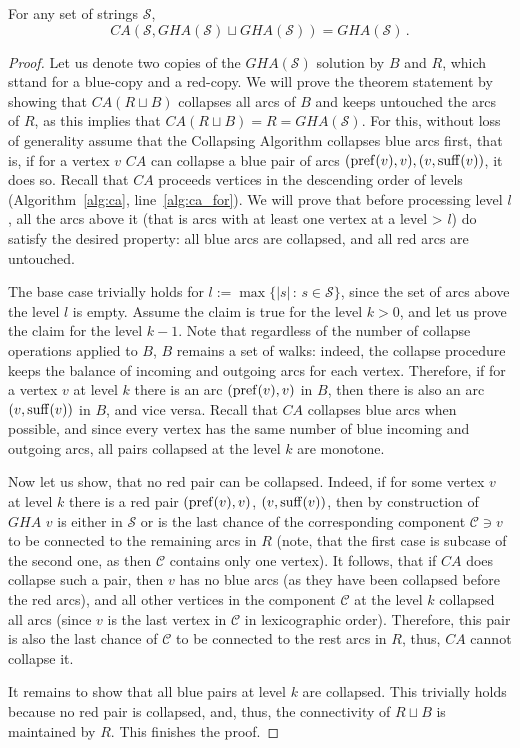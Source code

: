  \begin{theorem}
For any set of strings $\mathcal{S}$,
\[
			CA(\mathcal{S}, GHA(\mathcal{S}) \sqcup GHA(\mathcal{S})) = GHA(\mathcal{S}) \, .
\]
\end{theorem}
\begin{proof}
Let us denote two copies of the $GHA(\mathcal{S})$ solution by $B$ and $R$, which sttand for a blue-copy and a red-copy. We will prove the theorem statement by showing that $CA(R \sqcup B)$ collapses all arcs of $B$ and keeps untouched the arcs of $R$, as this implies that $CA(R \sqcup B)=R=GHA(\mathcal{S})$. For this, without loss of generality assume that the Collapsing Algorithm collapses blue arcs first, that is, if for a vertex $v$ $CA$ can collapse a blue pair of arcs $(\operatorname{pref}(v), v), (v, \operatorname{suff}(v))$, it does so. Recall that $CA$ proceeds vertices in the descending order of levels (Algorithm~\ref{alg:ca}, line~\ref{alg:ca_for}). We will prove that before processing level $l$, all the arcs above it (that is arcs with at least one vertex at a level > $l$) do satisfy the desired property: all blue arcs are collapsed, and all red arcs are untouched.

The base case trivially holds for $l := \max\{|s| \, : \, s\in\mathcal{S}\}$, since the set of arcs above the level $l$ is empty. Assume the claim is true for the level $k > 0$, and let us prove the claim for the level $k - 1$. Note that regardless of the number of collapse operations applied to $B$, $B$ remains a set of walks: indeed, the collapse procedure keeps the balance of incoming and outgoing arcs for each vertex. Therefore, if for a vertex $v$ at level $k$ there is an arc $(\operatorname{pref}(v), v)$ in $B$, then there is also an arc $(v, \operatorname{suff}(v))$ in $B$, and vice versa. Recall that $CA$ collapses blue arcs when possible, and since every vertex has the same number of blue incoming and outgoing arcs, all pairs collapsed at the level $k$ are monotone. 
	
	Now let us show, that no red pair can be collapsed. Indeed, if for some vertex $v$ at level $k$ there is a red pair $(\operatorname{pref}(v), v)$, $(v, \operatorname{suff}(v))$, then by construction of $GHA$ $v$ is either in $\mathcal{S}$ or is the last chance of the corresponding component $\mathcal{C} \ni v$ to be connected to the remaining arcs in $R$ (note, that the first case is subcase of the second one, as then $\mathcal{C}$ contains only one vertex). It follows, that if $CA$ does collapse such a pair, then $v$ has no blue arcs (as they have been collapsed before the red arcs), and all other vertices in the component $\mathcal{C}$ at the level $k$ collapsed all arcs (since $v$ is the last vertex in $\mathcal{C}$ in lexicographic order). Therefore, this pair is also the last chance of $\mathcal{C}$ to be connected to the rest arcs in $R$, thus, $CA$ cannot collapse it.
	
	It remains to show that all blue pairs at level $k$ are collapsed. This trivially holds because no red pair is collapsed, and, thus, the connectivity of $R \sqcup B$ is maintained by $R$. This finishes the proof.
\end{proof}


